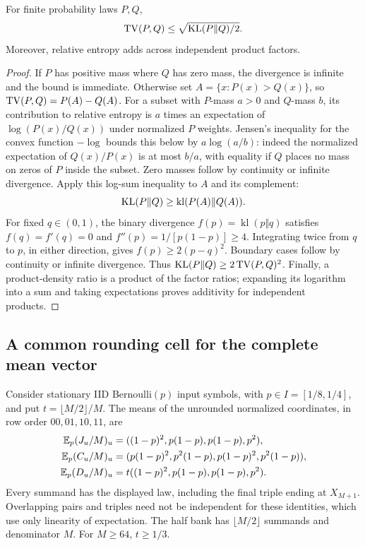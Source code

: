 \begin{lemma}
\label{lem:p-pinsker}
For finite probability laws $P,Q$,
\[
 \operatorname{TV}(P,Q)\le\sqrt{\operatorname{KL}(P\Vert Q)/2}.
\]
Moreover, relative entropy adds across independent product factors.
\end{lemma}
\begin{proof}
If $P$ has positive mass where $Q$ has zero mass, the divergence is
infinite and the bound is immediate.  Otherwise set
$A=\{x:P(x)>Q(x)\}$, so
$\operatorname{TV}(P,Q)=P(A)-Q(A)$.
For a subset with $P$-mass $a>0$ and $Q$-mass $b$, its contribution to
relative entropy is $a$ times an expectation of
$\log(P(x)/Q(x))$ under normalized $P$ weights.  Jensen's inequality
for the convex function $-\log$ bounds this below by
$a\log(a/b)$: indeed the normalized expectation of $Q(x)/P(x)$
is at most $b/a$, with equality if $Q$ places no mass on zeros of $P$
inside the subset.  Zero masses follow by continuity or infinite
divergence.  Apply this log-sum inequality to $A$ and its complement:
\[
 \operatorname{KL}(P\Vert Q)\ge\operatorname{kl}(P(A)\Vert Q(A)).
\]
For fixed $q\in(0,1)$, the binary divergence
$f(p)=\operatorname{kl}(p\Vert q)$ satisfies
$f(q)=f'(q)=0$ and $f''(p)=1/[p(1-p)]\ge4$.
Integrating twice from $q$ to $p$, in either direction, gives
$f(p)\ge2(p-q)^2$.  Boundary cases follow by continuity or infinite
divergence.  Thus $\operatorname{KL}(P\Vert Q)\ge2\operatorname{TV}(P,Q)^2$.
Finally, a product-density ratio is a product of the factor ratios;
expanding its logarithm into a sum and taking expectations proves
additivity for independent products.
\end{proof}

\subsection{A common rounding cell for the complete mean vector}

Consider stationary IID Bernoulli$(p)$ input symbols, with
$p\in I=[1/8,1/4]$, and put $t=\lfloor M/2\rfloor/M$.
The means of the unrounded normalized coordinates, in row order
$00,01,10,11$, are
\begin{align}
 \mathbb E_p(J_u/M)_u
   &=((1-p)^2,p(1-p),p(1-p),p^2),\label{eq:p-bank-J-means}\\
 \mathbb E_p(C_u/M)_u
   &=(p(1-p)^2,p^2(1-p),p(1-p)^2,p^2(1-p)),
     \label{eq:p-bank-C-means}\\
 \mathbb E_p(D_u/M)_u
   &=t((1-p)^2,p(1-p),p(1-p),p^2).
     \label{eq:p-bank-D-means}
\end{align}
Every summand has the displayed law, including the final triple ending
at $X_{M+1}$.  Overlapping pairs and triples need not be independent
for these identities, which use only linearity of expectation.
The half bank has $\lfloor M/2\rfloor$ summands and denominator $M$.
For $M\ge64$, $t\ge1/3$.

